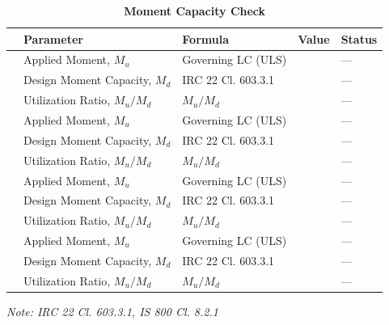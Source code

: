 \documentclass[12pt,a4paper]{report}
\numberwithin{table}{chapter}
\numberwithin{figure}{chapter}
\begin{document}
\vspace{1em}
\begin{longtable}{|C{2.5cm}|C{3.5cm}|C{3.5cm}|>{\centering\arraybackslash}p{4.2cm}|C{1.8cm}|}
\caption{\textbf{Moment Capacity Check}}\\
\hline
\textbf{} & \textbf{Parameter} & \textbf{Formula} & \textbf{Value} & \textbf{Status} \\[6pt]
\hline
{} & Applied Moment, $M_u$ & Governing LC (ULS) &  & --- \\[6pt]
 & Design Moment Capacity, $M_d$ & IRC 22 Cl. 603.3.1 &  & --- \\[6pt]
 & Utilization Ratio, $M_u / M_d$ & $M_u / M_d$ &  & --- \\[6pt]
\hline
{} & Applied Moment, $M_u$ & Governing LC (ULS) &  & --- \\[6pt]
 & Design Moment Capacity, $M_d$ & IRC 22 Cl. 603.3.1 &  & --- \\[6pt]
 & Utilization Ratio, $M_u / M_d$ & $M_u / M_d$ &  & --- \\[6pt]
\hline
{} & Applied Moment, $M_u$ & Governing LC (ULS) &  & --- \\[6pt]
 & Design Moment Capacity, $M_d$ & IRC 22 Cl. 603.3.1 &  & --- \\[6pt]
 & Utilization Ratio, $M_u / M_d$ & $M_u / M_d$ &  & --- \\[6pt]
\hline
{} & Applied Moment, $M_u$ & Governing LC (ULS) &  & --- \\[6pt]
 & Design Moment Capacity, $M_d$ & IRC 22 Cl. 603.3.1 &  & --- \\[6pt]
 & Utilization Ratio, $M_u / M_d$ & $M_u / M_d$ &  & --- \\[6pt]
\hline
\end{longtable}
\noindent\textit{Note: IRC 22 Cl. 603.3.1, IS 800 Cl. 8.2.1}
\end{document}
